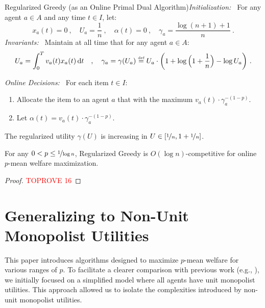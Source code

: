 \documentclass[11pt,letterpaper]{article}
\newcommand{\dif}[1]{\,\text{\rm d} #1}
\newcommand{\utility}{U}
\newcommand{\defeq}{\stackrel{\textrm{\tiny def}}{=}}
\begin{document}
\begin{algorithm}{Regularized Greedy (as an Online Primal Dual Algorithm)}\emph{Initialization:~}
	For any agent $a\in A$ and any time $t\in I$, let:
	\[
		x_a(t) = 0 ~,\quad \utility_a = \frac{1}{n} ~,\quad \alpha(t) = 0 ~,\quad \gamma_a = \frac{\log(n+1)+1}{n}
		~.
	\]
	\emph{Invariants:~}
	Maintain at all time that for any agent $a\in A$:
	\begin{equation}
		\label{eq:invariant-log(n)}
		\utility_a = \int_0^T v_a(t) x_a(t) \dif{t} \quad,\quad \gamma_a = \gamma(\utility_a) \defeq \utility_a \cdot \bigg(1+\log\Big(1+\frac{1}{n}\Big)-\log \utility_a\bigg)
		~.
	\end{equation}
	
	\emph{Online Decisions:~}
	For each item $t\in I$:
	\begin{enumerate}
		\item Allocate the item to an agent $a$ that with the maximum $v_a(t) \cdot \gamma_a^{-(1-p)}$.	
		\item Let $\alpha(t) = v_a(t) \cdot \gamma_a^{-(1-p)}$.
	\end{enumerate}
\end{algorithm}


\begin{lemma}
    \label{lem:p>0-invariant-gamma_a-properties}
    The regularized utility $\gamma(\utility)$ is increasing in $\utility \in [\nicefrac{1}{n}, 1+\nicefrac{1}{n}]$.
\end{lemma}
    

\begin{theorem}
    \label{thm:p>0-log(n)}
    For any $0 < p \le \nicefrac{1}{\log n}$, Regularized Greedy is $O(\log n)$-competitive for online $p$-mean welfare maximization.
\end{theorem}

\begin{proof}\textcolor{red}{TOPROVE 16}\end{proof}




    

 \section{Generalizing to Non-Unit Monopolist Utilities}
\label{sec:discussion}


This paper introduces algorithms designed to maximize $p$-mean welfare for various ranges of $p$. To facilitate a clearer comparison with previous work (e.g., \citet{BarmanKM:AAAI:2022}), we initially focused on a simplified model where all agents have unit monopolist utilities. This approach allowed us to isolate the complexities introduced by non-unit monopolist utilities. 
\end{document}
